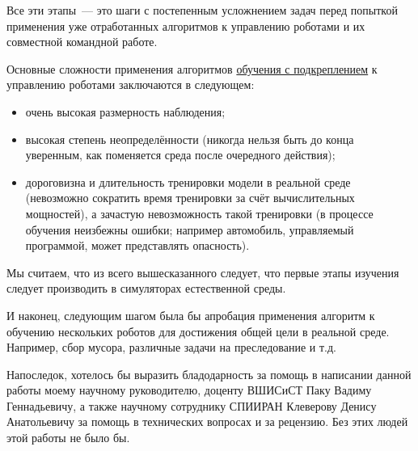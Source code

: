 Все эти этапы~--- это шаги с постепенным усложнением задач перед попыткой применения уже отработанных алгоритмов к управлению роботами и их совместной командной работе.

Основные сложности применения алгоритмов \hyperref[acr:rl]{обучения с подкреплением} к управлению роботами заключаются в следующем:
\begin{itemize}
    \item очень высокая размерность наблюдения;
    \item высокая степень неопределённости (никогда нельзя быть до конца уверенным, как поменяется среда после очередного действия);
    \item дороговизна и длительность тренировки модели в реальной среде (невозможно сократить время тренировки за счёт вычислительных мощностей), а зачастую невозможность такой тренировки (в процессе обучения неизбежны ошибки; например автомобиль, управляемый программой, может представлять опасность).
\end{itemize}

Мы считаем, что из всего вышесказанного следует, что первые этапы изучения следует производить в симуляторах естественной среды.

И наконец, следующим шагом была бы апробация применения алгоритм к обучению нескольких роботов для достижения общей цели в реальной среде. Например, сбор мусора, различные задачи на преследование и т.д.

Напоследок, хотелось бы выразить бладодарность за помощь в написании данной работы моему научному руководителю, доценту ВШИСиСТ Паку Вадиму Геннадьевичу, а также научному сотруднику СПИИРАН Клеверову Денису Анатольевичу за помощь в технических вопросах и за рецензию. Без этих людей этой работы не было бы.
